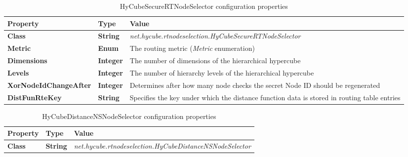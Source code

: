 \begin{table}
\scriptsize
\begin{center}
\begin{tabular}{p{3cm} p{1.5cm} p{10.0cm}}
	\hline
	\textbf{Property}						& \textbf{Type}					& \textbf{Value}					\\[1mm]
    \hline
	\textbf{Class}							& \textbf{String}				& \textit{net.hycube.rtnodeselection.HyCubeSecureRTNodeSelector}							\\[1.5mm]
	\textbf{Metric}							& \textbf{Enum}					& The routing metric (\emph{Metric} enumeration)											\\[1.5mm]
	\textbf{Dimensions}						& \textbf{Integer}				& The number of dimensions of the hierarchical hypercube									\\[1.5mm]
	\textbf{Levels}							& \textbf{Integer}				& The number of hierarchy levels of the hierarchical hypercube								\\[1.5mm]
    \textbf{XorNodeIdChangeAfter}			& \textbf{Integer}				& Determines after how many node checks the secret Node ID should be regenerated			\\[1.5mm]
	\textbf{DistFunRteKey}					& \textbf{String}				& Specifies the key under which the distance function data is stored in routing table entries	\\[1.5mm]
    \hline
\end{tabular}
\end{center}
\caption{HyCubeSecureRTNodeSelector configuration properties}
\label{tab:libHyCubeSecureRTNodeSelector}
\end{table}






\begin{table}
\scriptsize
\begin{center}
\begin{tabular}{p{3cm} p{3cm} p{8.5cm}}
	\hline
	\textbf{Property}						& \textbf{Type}					& \textbf{Value}					\\[1mm]
    \hline
	\textbf{Class}							& \textbf{String}				& \textit{net.hycube.rtnodeselection.HyCubeDistanceNSNodeSelector}			\\[1.5mm]
    \hline
\end{tabular}
\end{center}
\caption{HyCubeDistanceNSNodeSelector configuration properties}
\label{tab:libHyCubeDistanceNSNodeSelector}
\end{table}

